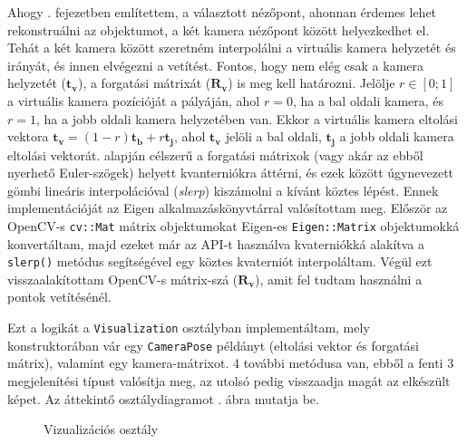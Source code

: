 Ahogy . fejezetben említettem, a választott nézőpont, ahonnan érdemes lehet rekonstruálni az objektumot, a két kamera nézőpont között helyezkedhet el. Tehát a két kamera között szeretném interpolálni a virtuális kamera helyzetét és irányát, és innen elvégezni a vetítést. Fontos, hogy nem elég csak a kamera helyzetét ($\mathbf{t_v}$), a forgatási mátrixát ($\mathbf{R_v}$) is meg kell határozni. Jelölje $r \in [0; 1]$ a virtuális kamera pozícióját a pályáján, ahol $r = 0$, ha a bal oldali kamera, és $r = 1$, ha a jobb oldali kamera helyzetében van. Ekkor a virtuális kamera eltolási vektora $\mathbf{t_v} = (1-r)\mathbf{t_b} + r\mathbf{t_j}$, ahol $\mathbf{t_v}$ jelöli a bal oldali, $\mathbf{t_j}$ a jobb oldali kamera eltolási vektorát. \cite{quaternion} alapján célszerű a forgatási mátrixok (vagy akár az ebből nyerhető Euler-szögek) helyett kvanterniókra áttérni, és ezek között úgynevezett gömbi lineáris interpolációval (\textit{slerp}) kiszámolni a kívánt köztes lépést. Ennek implementációját az Eigen \cite{eigenweb} alkalmazáskönyvtárral valósítottam meg. Először az OpenCV-s \texttt{cv::Mat} mátrix objektumokat Eigen-es \texttt{Eigen::Matrix} objektumokká konvertáltam, majd ezeket már az API-t használva kvaterniókká alakítva a \texttt{slerp()} metódus segítségével egy köztes kvaterniót interpoláltam. Végül ezt visszaalakítottam OpenCV-s mátrix-szá ($\mathbf{R_v}$), amit fel tudtam használni a pontok vetítésénél.

Ezt a logikát a \texttt{Visualization} osztályban implementáltam, mely konstruktorában vár egy \texttt{CameraPose} példányt (eltolási vektor és forgatási mátrix), valamint egy kamera-mátrixot. 4 további metódusa van, ebből a fenti 3 megjelenítési típust valósítja meg, az utolsó pedig visszaadja magát az elkészült képet. Az áttekintő osztálydiagramot . ábra mutatja be.

\begin{figure}[tbh]
\centering


\caption{Vizualizációs osztály \label{fig:cd:visualization}}
\end{figure}

